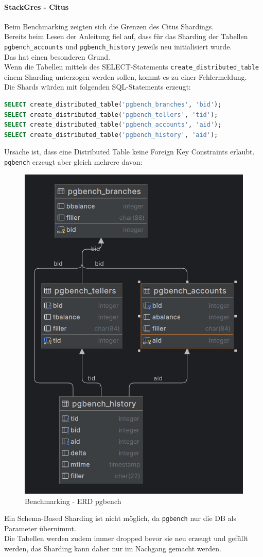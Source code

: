 \begin{flushleft}

    \paragraph{StackGres - Citus}
    Beim Benchmarking zeigten sich die Grenzen des Citus Shardings.\\
    Bereits beim Lesen der Anleitung fiel auf, dass für das Sharding der Tabellen \texttt{pgbench\_accounts} und \texttt{pgbench\_history} jeweils neu initialisiert wurde\cite{6CJFR7RM}.\\
    Das hat einen besonderen Grund.\\
    Wenn die Tabellen mittels des SELECT-Statements \texttt{create\_distributed\_table} einem Sharding unterzogen werden sollen, kommt es zu einer Fehlermeldung.\\
    Die Shards würden mit folgenden SQL-Statements erzeugt:
\lstset{style=gra_codestyle}
\begin{lstlisting}[language=sql, caption=Citus - Benchmarking - Distributed Table Sharding,captionpos=b,label={lst:benchmarking_distributed_table_sharding},breaklines=true]
SELECT create_distributed_table('pgbench_branches', 'bid');
SELECT create_distributed_table('pgbench_tellers', 'tid');
SELECT create_distributed_table('pgbench_accounts', 'aid');
SELECT create_distributed_table('pgbench_history', 'aid');
\end{lstlisting}
    Ursache ist, dass eine Distributed Table keine Foreign Key Constraints erlaubt.\\
    \texttt{pgbench} erzeugt aber gleich mehrere davon:\\
    \begin{figure}[H]
        \centering
        \includegraphics[width=0.5\linewidth]{source/implementation/evaluation/benchmarking/stackgres_citus/pgbench_accounts}
        \caption{Benchmarking - ERD pgbench}
        \label{fig:pgbench_accounts}
    \end{figure}
    Ein Schema-Based Sharding ist nicht möglich, da \texttt{pgbench} nur die DB als Parameter übernimmt.\\
    Die Tabellen werden zudem immer dropped bevor sie neu erzeugt und gefüllt werden, das Sharding kann daher nur im Nachgang gemacht werden.\\
\end{flushleft}

